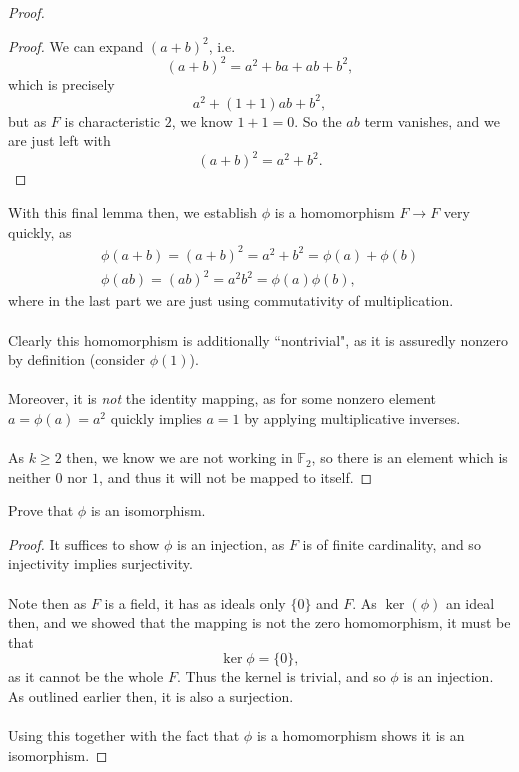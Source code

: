 \documentclass[12pt]{article}
\newenvironment{ex}[2][Exercise]{\begin{trivlist}
\item[\hskip \labelsep {\bfseries #1}\hskip \labelsep {\bfseries #2.}]}{\end{trivlist}}
\newenvironment{lemma}[2][Lemma]{\begin{trivlist}
\item[\hskip \labelsep {\bfseries #1}\hskip \labelsep {\bfseries #2.}]}{\end{trivlist}}
\begin{document}
\begin{ex}{5}
\begin{enumerate}[label=(\alph*)]
\begin{proof}
\begin{lemma}{3}
\begin{proof}
                    We can expand $(a + b)^2$, i.e. 
                    $$(a + b)^2 = a^2 + ba + ab + b^2,$$
                    which is precisely 
                    $$a^2 + (1 + 1)ab + b^2,$$
                    but as $F$ is characteristic $2$, we know $1 + 1 = 0$. So the $ab$ term vanishes, and we are just left with 
                    $$(a + b)^2 = a^2 + b^2.$$
                \end{proof}
            \end{lemma}
            With this final lemma then, we establish $\phi$ is a homomorphism $F \rightarrow F$ very quickly, as 
            \begin{align*}
                \phi(a + b) = (a + b)^2 = a^2 + b^2 = \phi(a) + \phi(b) \\
                \phi(ab) = (ab)^2 = a^2b^2 = \phi(a)\phi(b),
            \end{align*}
            where in the last part we are just using commutativity of multiplication. \\ \\
            Clearly this homomorphism is additionally ``nontrivial", as it is assuredly nonzero by definition (consider $\phi(1)$). \\ \\
            Moreover, it is \textit{not} the identity mapping, as for some nonzero element $a = \phi(a) = a^2$ quickly implies $a = 1$ by applying multiplicative inverses. \\ \\As $k \geq 2$ then, we know we are not working in $\mathbb{F}_2$, so there is an element which is neither $0$ nor $1$, and thus it will not be mapped to itself.
        \end{proof}
        \item Prove that $\phi$ is an isomorphism.
        \begin{proof}
            It suffices to show $\phi$ is an injection, as $F$ is of finite cardinality, and so injectivity implies surjectivity. \\ \\
            Note then as $F$ is a field, it has as ideals only $\{0\}$ and $F$. As $\ker(\phi)$ an ideal then, and we showed that the mapping is not the zero homomorphism, it must be that 
            $$\ker\phi = \{0\},$$
            as it cannot be the whole $F$. Thus the kernel is trivial, and so $\phi$ is an injection. As outlined earlier then, it is also a surjection. \\ \\Using this together with the fact that $\phi$ is a homomorphism shows it is an isomorphism.
        \end{proof}
    \end{enumerate}
\end{ex}
\end{document}
